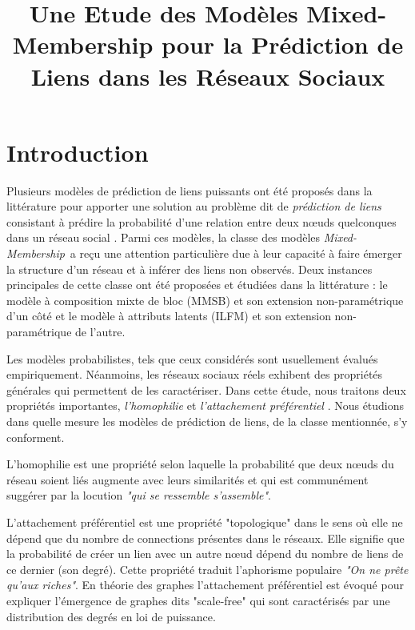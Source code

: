 \documentclass[french]{hermes-journal}
\title[]{Une Etude des Modèles Mixed-Membership pour la Prédiction de Liens dans les Réseaux Sociaux}
\newcommand{\mmm}{\textit{Mixed-Membership}~}
\begin{document}
\maketitle

\newpage






\section{Introduction}

\label{sec:intro}

Plusieurs modèles de prédiction de liens puissants ont été proposés dans la littérature pour apporter une solution au problème dit de \textit{prédiction de liens} consistant à prédire la probabilité d'une relation entre deux n\oe{}uds quelconques dans un réseau social \cite{LibenNowell07, HassanZaki11}.
Parmi ces modèles, la classe des modèles \mmm a reçu une attention particulière due à leur capacité à faire émerger la structure d'un réseau et à inférer des liens non observés.
Deux instances principales de cette classe ont été proposées et étudiées  dans la littérature : le modèle à composition mixte de bloc (MMSB) \cite{MMSB} et son extension non-paramétrique \cite{iMMSB, fan2015dynamic} d'un côté et le modèle à attributs latents (ILFM) \cite{BMF} et son extension non-paramétrique \cite{ILFRM} de l'autre. 


Les modèles probabilistes, tels que ceux considérés sont usuellement évalués empiriquement. Néanmoins, les réseaux sociaux réels exhibent des propriétés générales qui permettent de les caractériser. Dans cette étude, nous traitons deux propriétés importantes, \textit{l'homophilie} et \textit{l'attachement préférentiel} \cite{ Barabasi2003}. Nous étudions dans quelle mesure les modèles de prédiction de liens, de la classe mentionnée, s'y conforment.

L'homophilie est une propriété selon laquelle la probabilité que deux n\oe{}uds du réseau soient liés augmente avec leurs similarités et qui est communément suggérer par la locution \emph{"qui se ressemble s'assemble"}.

L'attachement préférentiel est une propriété "topologique" dans le sens où elle ne dépend que du nombre de connections présentes dans le réseaux. Elle signifie que la probabilité de créer un lien avec un autre n\oe{}ud dépend du nombre de liens de ce dernier (son degré). Cette propriété traduit l'aphorisme populaire \emph{"On ne prête qu'aux riches"}. En théorie des graphes l'attachement préférentiel est évoqué pour expliquer l'émergence de graphes dits "scale-free" qui sont caractérisés par une distribution des degrés en loi de puissance.
\end{document}
